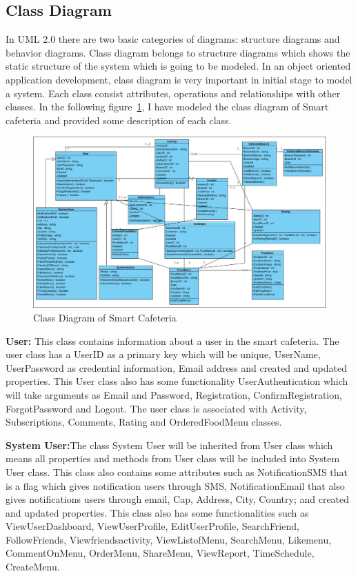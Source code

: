 \subsection{Class Diagram}
\label{subsec:classdiagram}
In UML 2.0 \cite{Donald} there are two basic categories of diagrams:
structure diagrams and behavior diagrams. Class diagram belongs to structure
diagrams which shows the static structure of the system which is going to be
modeled. In an object oriented application development, class diagram is very
important in initial stage to model a system. Each class consist attributes,
operations and relationships with other classes. In the following
figure~\ref{ClassDiagram}, I have modeled the class diagram of Smart cafeteria
and provided some description of each class.

\begin{landscape}
\begin{figure}[h!t]
    \centering
      \includegraphics[width=9in]{ch3/ClassDiagram/Class}
  \caption{Class Diagram of Smart Cafeteria}
  \label{ClassDiagram}
\end{figure}
\end{landscape}
\textbf{User:} This class contains information about a user in the smart
cafeteria. The user class has a UserID as a primary key which will be unique,
UserName, UserPassword as credential information, Email address and created and
updated properties. This User class also has some functionality
UserAuthentication which will take arguments as Email and Password,
Registration, ConfirmRegistration, ForgotPassword and Logout. The user class is
associated with Activity, Subscriptions, Comments, Rating and OrderedFoodMenu
classes.

\textbf{System User:}The class System User will be inherited from User class
which means all properties and methods from User class will be included into
System User class. This class also contains some attributes such as
NotificationSMS that is a flag which gives notification users through SMS,
NotificationEmail that also gives notifications users through email, Cap,
Address, City, Country; and created and updated properties. This class also has
some functionalities such as ViewUserDashboard, ViewUserProfile,
EditUserProfile, SearchFriend, FollowFriends, Viewfriendsactivity,
ViewListofMenu, SearchMenu, Likemenu, CommentOnMenu, OrderMenu, ShareMenu,
ViewReport, TimeSchedule, CreateMenu.

